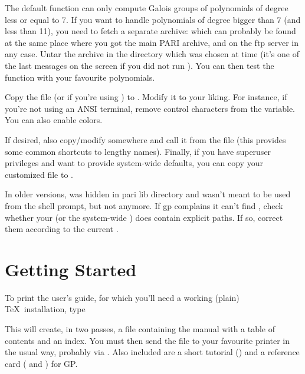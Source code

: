  The default  function can only
compute Galois groups of polynomials of degree less or equal to 7. If you
want to handle polynomials of degree bigger than 7 (and less than 11), you
need to fetch a separate archive:  which can probably be
found at the same place where you got the main PARI archive, and on the
 ftp server in any case. Untar the archive in the 
directory which was chosen at  time (it's one of the last
messages on the screen if you did not run ). You can then
test the  function with your favourite polynomials.

 Copy the file  (or
 if you're using ) to . Modify
it to your liking. For instance, if you're not using an ANSI terminal,
remove control characters from the  variable. You can also
enable colors. 

If desired, also copy/modify  somewhere and call it from
the  file (this provides some common shortcuts to lengthy names).
Finally, if you have superuser privileges and want to provide system-wide
defaults, you can copy your customized  file to .

In older versions,  was hidden in pari lib directory and wasn't
meant to be used from the shell prompt, but not anymore. If gp complains it
can't find , check whether your  (or the system-wide
) does contain explicit paths. If so, correct them according to the
current .

\section{Getting Started}

 To print the user's guide, for which you'll
need a working (plain) \TeX\ installation, type


\noindent This will create, in two passes, a file 
containing the manual with a table of contents and an index. You must then
send the  file to your favourite printer in the usual way,
probably via . Also included are a short tutorial
() and a reference card (
and ) for GP.

